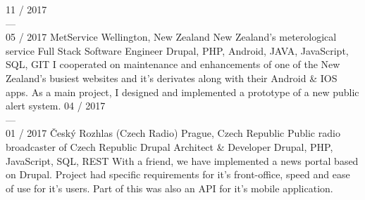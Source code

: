 \documentclass[]{friggeri-cv} %
\begin{document}
\begin{entrylist}
  \job
  {11 / 2017 \\ --- \\ 05 / 2017}
  {MetService}
  {Wellington, New Zealand}
  {New Zealand's meterological service}
  {
  \position
  {Full Stack Software Engineer}
  {Drupal, PHP, Android, JAVA, JavaScript, SQL, GIT}
  {
  I cooperated on maintenance and enhancements of one of the New Zealand's busiest websites and it's derivates along with their Android \& IOS apps.
  As a main project, I designed and implemented a prototype of a new public alert system.
  }
  }
  \job
  {04 / 2017 \\ --- \\ 01 / 2017}
  {Český Rozhlas (Czech Radio)}
  {Prague, Czech Republic}
  {Public radio broadcaster of Czech Republic}
  {
    \position
      {Drupal Architect \& Developer}
      {Drupal, PHP, JavaScript, SQL, REST}
      {
        With a friend, we have implemented a news portal based on Drupal. Project had specific requirements for
        it's front-office, speed and ease of use for it's users. Part of this was also an API for it's mobile application.
      }%
  }


\end{entrylist}
\end{document}
